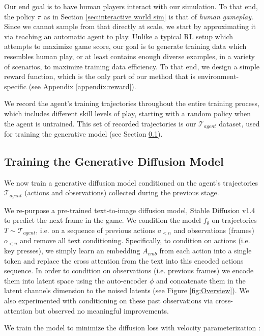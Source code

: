\documentclass{article} %
\begin{document}
Our end goal is to have human players interact with our simulation. To that end, the policy $\pi$ as in Section \ref{sec:interactive world sim} is that of \emph{human gameplay}. Since we cannot sample from that directly at scale, we start by approximating it via teaching an automatic agent to play. Unlike a typical RL setup which attempts to maximize game score, our goal is to generate training data which resembles human play, or at least contains enough diverse examples, in a variety of scenarios, to maximize training data efficiency.
To that end, we design a simple reward function, which is the only part of our method that is environment-specific (see Appendix \ref{appendix:reward}).

We record the agent's training trajectories throughout the entire training process, which includes different skill levels of play, starting with a random policy when the agent is untrained.
This set of recorded trajectories is our $\mathcal{T}_{agent}$ dataset, used for training the generative model (see Section \ref{training-diffusion-model}).

\subsection{Training the Generative Diffusion Model}
\label{training-diffusion-model}

We now train a generative diffusion model conditioned on the agent's trajectories $\mathcal{T}_{agent}$ (actions and observations) collected during the previous stage.

We re-purpose a pre-trained text-to-image diffusion model, Stable Diffusion v1.4 \citep{rombach2022high} to predict the next frame in the game.
We condition the model $f_{\theta}$ on trajectories $T \sim \mathcal{T}_{agent}$, i.e. on a sequence of previous actions $a_{<n}$ and observations (frames) $o_{<n}$ and remove all text conditioning.
Specifically, to condition on actions (i.e. key presses), we simply learn an embedding $A_{emb}$ from each action into a single token and replace the cross attention from the text into this encoded actions sequence.
In order to condition on observations (i.e. previous frames) we encode them into latent space using the auto-encoder $\phi$ and concatenate them in the latent channels dimension to the noised latents (see Figure \ref{fig:Overview}). We also experimented with conditioning on these past observations via cross-attention but observed no meaningful improvements.

We train the model to minimize the diffusion loss with velocity parameterization \citep{salimans2022progressivedistillationfastsampling}:
\end{document}
